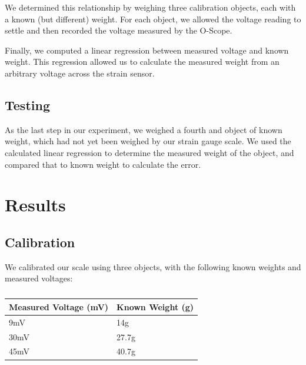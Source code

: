 \documentclass[11pt]{article}
\begin{document}
We determined this relationship by weighing three calibration objects, each with a known (but different) weight. For each object, we allowed the voltage reading to settle and then recorded the voltage measured by the O-Scope.

Finally, we computed a linear regression between measured voltage and known weight. This regression allowed us to calculate the measured weight from an arbitrary voltage across the strain sensor.

\subsection{Testing}

As the last step in our experiment, we weighed a fourth and object of known weight, which had not yet been weighed by our strain gauge scale. We used the calculated linear regression to determine the measured weight of the object, and compared that to known weight to calculate the error.

\section{Results}

\subsection{Calibration}

We calibrated our scale using three objects, with the following known weights and measured voltages:

\begin{table}[!ht]
    \centering
    \begin{tabular}{ll}
    \hline
    \multicolumn{1}{c}{\textbf{Measured Voltage (mV)}} & \multicolumn{1}{c}{\textbf{Known Weight (g)}} \\ \hline
    9mV                                                & 14g                                           \\
    30mV                                               & 27.7g                                         \\
    45mV                                               & 40.7g                                         \\ \hline
    \end{tabular}
    \caption{}
    \label{table:calibration}
\end{table}
\end{document}
